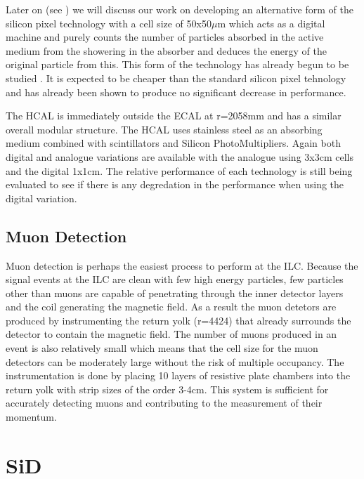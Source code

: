 Later on (see ) we will discuss our work on developing an alternative form of the silicon pixel technology with a cell size of 50x50${\mu}$m which acts as a digital machine and purely counts the number of particles absorbed in the active medium from the showering in the absorber and deduces the energy of the original particle from this.  This form of the technology has already begun to be studied \cite{2011JInst...6.5009B}. It is expected to be cheaper than the standard silicon pixel tehnology and has already been shown to produce no significant decrease in performance.

The \ac{HCAL} is immediately outside the ECAL at r=2058mm and has a similar overall modular structure. The HCAL uses stainless steel as an absorbing medium combined with scintillators and Silicon PhotoMultipliers. Again both digital and analogue variations are available with the analogue using 3x3cm cells and the digital 1x1cm. The relative performance of each technology is still being evaluated to see if there is any degredation in the performance when using the digital variation.

\subsection{Muon Detection}
Muon detection is perhaps the easiest process to perform at the ILC. Because the signal events at the ILC are clean with few high energy particles, few particles other than muons are capable of penetrating through the inner detector layers and the coil generating the magnetic field. As a result the muon detetors are produced by instrumenting the return yolk (r=4424) that already surrounds the detector to contain the magnetic field. The number of muons produced in an event is also relatively small which means that the cell size for the muon detectors can be moderately large without the risk of multiple occupancy. The instrumentation is done by placing 10 layers of resistive plate chambers into the return yolk with strip sizes of the order 3-4cm. This system is sufficient for accurately detecting muons and contributing to the measurement of their momentum.

\section{SiD}

